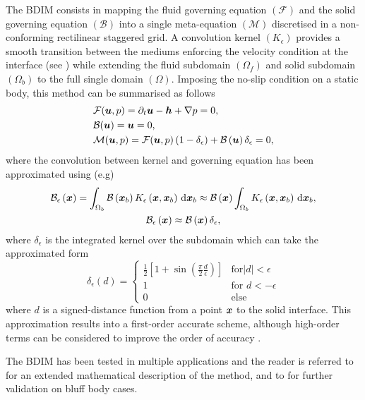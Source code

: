 \documentclass[../main.tex]{subfiles}
\begin{document}
The BDIM consists in mapping the fluid governing equation $(\mathcal{F})$ and the solid governing equation $(\mathcal{B})$ into a single meta-equation $(\mathcal{M})$ discretised in a non-conforming rectilinear staggered grid.
A convolution kernel $(K_\epsilon)$ provides a smooth transition between the mediums enforcing the velocity condition at the interface (see ) while extending the fluid subdomain $(\Omega_f)$ and solid subdomain $(\Omega_b)$ to the full single domain $(\Omega)$.
Imposing the no-slip condition on a static body, this method can be summarised as follows
\begin{align}
&\mathcal{F}(\boldsymbol{u},p)=\partial_t\boldsymbol{u}-\boldsymbol{h}+\nabla p=0,\\
&\mathcal{B}(\boldsymbol{u})=\boldsymbol{u}=0,\\
&\mathcal{M}(\boldsymbol{u},p)=\mathcal{F}(\boldsymbol{u},p)\left(1-\delta_\epsilon \right)+\mathcal{B}\left(\boldsymbol{u} \right)\delta_\epsilon=0,
\end{align}
where the convolution between kernel and governing equation has been approximated using (e.g)
\begin{gather}
\mathcal{B}_\epsilon\left(\boldsymbol{x} \right)=\int_{\Omega_b}\mathcal{B}\left(\boldsymbol{x}_b \right)K_\epsilon\left(\boldsymbol{x},\boldsymbol{x}_b \right)\,\mathrm{d}\boldsymbol{x}_b\approx \mathcal{B}\left(\boldsymbol{x} \right)\int_{\Omega_b}K_\epsilon\left(\boldsymbol{x},\boldsymbol{x}_b \right)\,\mathrm{d}\boldsymbol{x}_b,\\
\mathcal{B}_\epsilon\left(\boldsymbol{x} \right)\approx\mathcal{B}\left(\boldsymbol{x} \right)\delta_\epsilon,
\end{gather}
where $\delta_\epsilon$ is the integrated kernel over the subdomain which can take the approximated form
\begin{equation}
\delta_\epsilon(d)=
	\begin{cases}
		\frac{1}{2}[1+\sin(\frac{\pi}{2}\frac{d}{\epsilon})] & \mathrm{for} \left|d\right|<\epsilon\\
		1 & \mathrm{for}\,\,d<-\epsilon\\
		0 & \mathrm{else}
	\end{cases}
\end{equation}
where $d$ is a signed-distance function from a point $\boldsymbol{x}$ to the solid interface. This approximation results into a first-order accurate scheme, although high-order terms can be considered to improve the order of accuracy \citep{Maertens2015}.

The BDIM has been tested in multiple applications and the reader is referred to \cite{Maertens2015} for an extended mathematical description of the method, and to \cite{Schulmeister2017} for further validation on bluff body cases.
\end{document}
